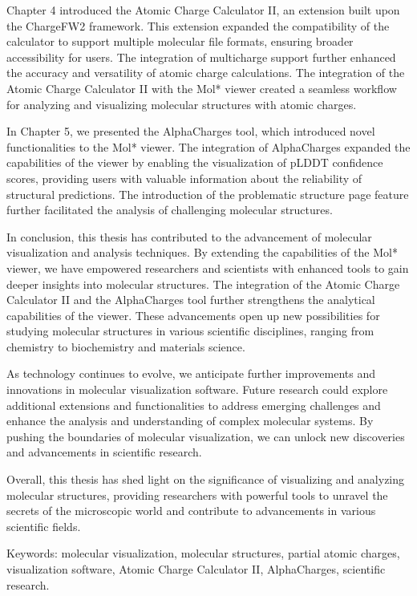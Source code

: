 \documentclass[
  digital,     %
  oneside,     %
  nosansbold,  %
  nocolorbold, %
  lof,         %
  lot,         %
]{fithesis4}
\begin{document}
Chapter 4 introduced the Atomic Charge Calculator II, an extension built upon the ChargeFW2 framework. This extension expanded the compatibility of the calculator to support multiple molecular file formats, ensuring broader accessibility for users. The integration of multicharge support further enhanced the accuracy and versatility of atomic charge calculations. The integration of the Atomic Charge Calculator II with the Mol* viewer created a seamless workflow for analyzing and visualizing molecular structures with atomic charges.

In Chapter 5, we presented the AlphaCharges tool, which introduced novel functionalities to the Mol* viewer. The integration of AlphaCharges expanded the capabilities of the viewer by enabling the visualization of pLDDT confidence scores, providing users with valuable information about the reliability of structural predictions. The introduction of the problematic structure page feature further facilitated the analysis of challenging molecular structures.

In conclusion, this thesis has contributed to the advancement of molecular visualization and analysis techniques. By extending the capabilities of the Mol* viewer, we have empowered researchers and scientists with enhanced tools to gain deeper insights into molecular structures. The integration of the Atomic Charge Calculator II and the AlphaCharges tool further strengthens the analytical capabilities of the viewer. These advancements open up new possibilities for studying molecular structures in various scientific disciplines, ranging from chemistry to biochemistry and materials science.

As technology continues to evolve, we anticipate further improvements and innovations in molecular visualization software. Future research could explore additional extensions and functionalities to address emerging challenges and enhance the analysis and understanding of complex molecular systems. By pushing the boundaries of molecular visualization, we can unlock new discoveries and advancements in scientific research.

Overall, this thesis has shed light on the significance of visualizing and analyzing molecular structures, providing researchers with powerful tools to unravel the secrets of the microscopic world and contribute to advancements in various scientific fields.

Keywords: molecular visualization, molecular structures, partial atomic charges, visualization software, Atomic Charge Calculator II, AlphaCharges, scientific research.
\end{document}

